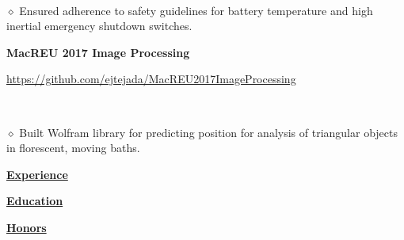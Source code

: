 \documentclass [11pt]{article}
\begin{document}
\begin{flushleft}
‭	\begin{minipage}{1.0 \linewidth}\begin{flushright}$\diamond$ Ensured adherence to safety guidelines for battery temperature and high inertial emergency shutdown switches.\end{flushright}\end{minipage}

\textbf{MacREU 2017 Image Processing}\begin{minipage}{0.71 \linewidth}\begin{flushright}\href{https://github.com/ejtejada/MacREU2017ImageProcessing}{https://github.com/ejtejada/MacREU2017ImageProcessing}\end{flushright}\end{minipage}

‭	\begin{minipage}{1.0 \linewidth}\begin{flushright}$\diamond$ ‭Built Wolfram library for predicting position for analysis of triangular objects in florescent, moving baths. \end{flushright}\end{minipage}
\underline{\textbf{Experience}}
\linebreak

\underline{\textbf{Education}}
\linebreak

\underline{\textbf{Honors}}
\linebreak
\end{flushleft}
\end{document}
